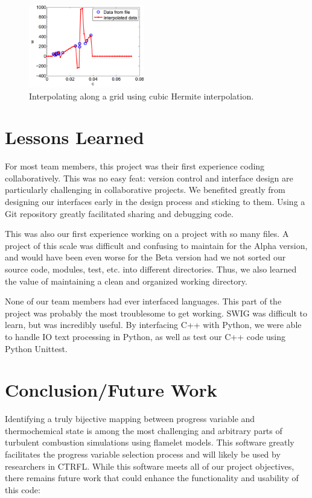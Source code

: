 \documentclass[11pt]{article}
\begin{document}
\begin{figure} [h]
\centering
\includegraphics[width=0.45\textwidth]{interpolator.PNG}
\caption{\label{fig:interpolator} Interpolating along a grid using
  cubic Hermite interpolation.}
\end{figure}


\section{Lessons Learned}
For most team members, this project was their first experience coding
collaboratively. This was no easy feat: version control and interface
design are particularly challenging in collaborative projects. We
benefited greatly from designing our interfaces early in the design
process and sticking to them. Using a Git repository greatly
facilitated sharing and debugging code.

This was also our first experience working on a project with so many
files. A project of this scale was difficult and confusing to maintain
for the Alpha version, and would have been even worse for the Beta
version had we not sorted our source code, modules, test, etc. into
different directories. Thus, we also learned the value of maintaining
a clean and organized working directory.

None of our team members had ever interfaced languages. This part of
the project was probably the most troublesome to get working. SWIG was
difficult to learn, but was incredibly useful. By interfacing C++ with
Python, we were able to handle IO text processing in Python, as well
as test our C++ code using Python Unittest.

\section{Conclusion/Future Work}
Identifying a truly bijective mapping between progress variable and
thermochemical state is among the most challenging and arbitrary parts
of turbulent combustion simulations using flamelet models. This
software greatly facilitates the progress variable selection process
and will likely be used by researchers in CTRFL. While this software
meets all of our project objectives, there remains future work that
could enhance the functionality and usability of this code:
\end{document}
